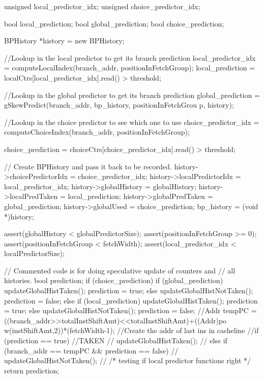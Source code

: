 \begin{DoxyCode}
{
    unsigned local_predictor_idx;
    unsigned choice_predictor_idx;

    bool local_prediction;
    bool global_prediction;
    bool choice_prediction;

    BPHistory *history = new BPHistory;

    //Lookup in the local predictor to get its branch prediction
    local_predictor_idx = computeLocalIndex(branch_addr, positionInFetchGroup);
    local_prediction = localCtrs[local_predictor_idx].read() > threshold;

    //Lookup in the global predictor to get its branch prediction
    global_prediction = gSkewPredict(branch_addr, bp_history, positionInFetchGrou
      p, history);

    //Lookup in the choice predictor to see which one to use
    choice_predictor_idx = computeChoiceIndex(branch_addr, positionInFetchGroup);
      
    choice_prediction = choiceCtrs[choice_predictor_idx].read() > threshold;

    // Create BPHistory and pass it back to be recorded.
    history->choicePredictorIdx = choice_predictor_idx;
    history->localPredictorIdx  = local_predictor_idx;
    history->globalHistory = globalHistory;
    history->localPredTaken = local_prediction;
    history->globalPredTaken = global_prediction;
    history->globalUsed = choice_prediction;
    bp_history = (void *)history;

    assert(globalHistory < globalPredictorSize);
    assert(positionInFetchGroup >= 0);
    assert(positionInFetchGroup < fetchWidth);
    assert(local_predictor_idx < localPredictorSize);

    // Commented code is for doing speculative update of counters and
    // all histories.
        bool prediction;
    if (choice_prediction) {
        if (global_prediction) {
                        updateGlobalHistTaken();
                        prediction = true;
        } else {
                        updateGlobalHistNotTaken();
                        prediction = false;
        }
    } else {
        if (local_prediction) {
                        updateGlobalHistTaken();
                        prediction = true;
        } else {
                        updateGlobalHistNotTaken();
                        prediction = false;
        }
    }
  //Addr tempPC = ((branch_addr>>totalInstShiftAmt)<<totalInstShiftAmt)+((Addr)po
      w(instShiftAmt,2))*(fetchWidth-1); //Create the addr of last ins in cacheline
  //if (prediction == true) { //TAKEN
  //    updateGlobalHistTaken();
  //} else if (branch_addr == tempPC && prediction == false) {
  //    updateGlobalHistNotTaken();
  //}
    /* testing if local predictor functions right */
    return prediction;
}
\end{DoxyCode}



